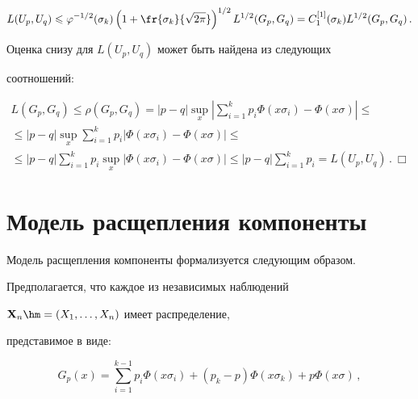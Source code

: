$$

L(U_p,U_q)\leqslant\varphi^{-1/2}(\sigma_k)\left(1+\fr{\sigma_k}{\sqrt{2\pi}}

\right)^{1/2}L^{1/2}(G_p,G_q)=C_1^{[1]}(\sigma_k)L^{1/2}(G_p,G_q)\,.

$$



Оценка снизу для $L(U_p,U_q)$ может быть найдена из следующих

соотношений:

\begin{multline*}

L(G_p,G_q)\leqslant\rho(G_p,G_q)=|p-q|\sup\limits_x\left|\sum\limits_{i=1}^k

p_i\Phi(x\sigma_i)-\Phi(x\sigma)\right|\leqslant{} \\

{}\leqslant |p-q|\sup\limits_x\sum\limits_{i=1}^k

p_i|\Phi(x\sigma_i)-\Phi(x\sigma)|\leqslant{}\\

{}\leqslant |p-q|\sum\limits_{i=1}^k

p_i\sup\limits_x|\Phi(x\sigma_i)-\Phi(x\sigma)|

\leqslant |p-q|\sum\limits_{i=1}^k p_i= L(U_p,U_q)\,.~\Box

\end{multline*}









\section{Модель расщепления компоненты}



Модель расщепления компоненты формализуется следующим образом.

Предполагается, что каждое из независимых наблюдений

$\mathbf{X}_n\hm=(X_1,\ldots , X_n)$ имеет распределение,

представимое в виде:

\begin{equation}

\label{Stab_G_p2}

G_p(x)=\sum\limits_{i=1}^{k-1}

p_i\Phi(x\sigma_i)+(p_k-p)\Phi(x\sigma_k)+p\Phi(x\sigma)\,,

\end{equation}

